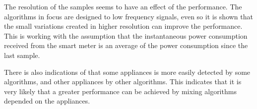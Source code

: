 The resolution of the samples seems to have an effect of the performance. The algorithms in focus are designed to low frequency signals, even so it is shown that the small variations created in higher resolution can improve the performance. This is working with the assumption that the instantaneous power consumption received from the smart meter is an average of the power consumption since the last sample. 

There is also indications of that some appliances is more easily detected by some algorithms, and other appliances by other algorithms. This indicates that it is very likely that a greater performance can be achieved by mixing algorithms depended on the appliances.